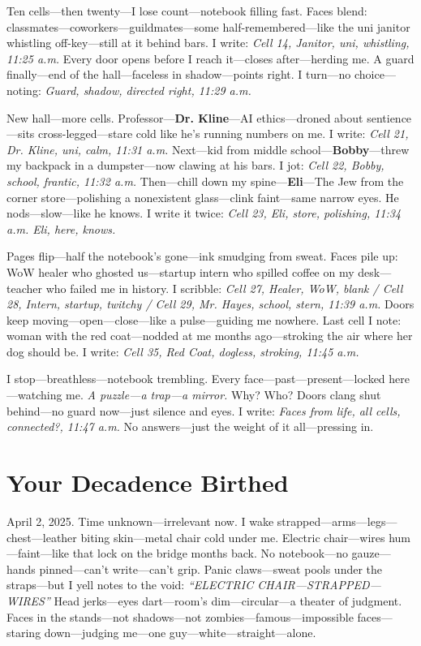 \documentclass{article}
\begin{document}
Ten cells—then twenty—I lose count—notebook filling fast. Faces blend: classmates—coworkers—guildmates—some half-remembered—like the uni janitor whistling off-key—still at it behind bars. I write: \textit{Cell 14, Janitor, uni, whistling, 11:25 a.m.} Every door opens before I reach it—closes after—herding me. A guard finally—end of the hall—faceless in shadow—points right. I turn—no choice—noting: \textit{Guard, shadow, directed right, 11:29 a.m.}

New hall—more cells. Professor—\textbf{Dr. Kline}—AI ethics—droned about sentience—sits cross-legged—stare cold like he’s running numbers on me. I write: \textit{Cell 21, Dr. Kline, uni, calm, 11:31 a.m.} Next—kid from middle school—\textbf{Bobby}—threw my backpack in a dumpster—now clawing at his bars. I jot: \textit{Cell 22, Bobby, school, frantic, 11:32 a.m.} Then—chill down my spine—\textbf{Eli}—The Jew from the corner store—polishing a nonexistent glass—clink faint—same narrow eyes. He nods—slow—like he knows. I write it twice: \textit{Cell 23, Eli, store, polishing, 11:34 a.m. Eli, here, knows.}

Pages flip—half the notebook’s gone—ink smudging from sweat. Faces pile up: WoW healer who ghosted us—startup intern who spilled coffee on my desk—teacher who failed me in history. I scribble: \textit{Cell 27, Healer, WoW, blank / Cell 28, Intern, startup, twitchy / Cell 29, Mr. Hayes, school, stern, 11:39 a.m.} Doors keep moving—open—close—like a pulse—guiding me nowhere. Last cell I note: woman with the red coat—nodded at me months ago—stroking the air where her dog should be. I write: \textit{Cell 35, Red Coat, dogless, stroking, 11:45 a.m.}

I stop—breathless—notebook trembling. Every face—past—present—locked here—watching me. \textit{A puzzle—a trap—a mirror.} Why? Who? Doors clang shut behind—no guard now—just silence and eyes. I write: \textit{Faces from life, all cells, connected?, 11:47 a.m.} No answers—just the weight of it all—pressing in.

\section*{Your Decadence Birthed}

April 2, 2025. Time unknown—irrelevant now. I wake strapped—arms—legs—chest—leather biting skin—metal chair cold under me. Electric chair—wires hum—faint—like that lock on the bridge months back. No notebook—no gauze—hands pinned—can’t write—can’t grip. Panic claws—sweat pools under the straps—but I yell notes to the void: \textit{“ELECTRIC CHAIR—STRAPPED—WIRES”} Head jerks—eyes dart—room’s dim—circular—a theater of judgment. Faces in the stands—not shadows—not zombies—famous—impossible faces—staring down—judging me—one guy—white—straight—alone.
\end{document}
